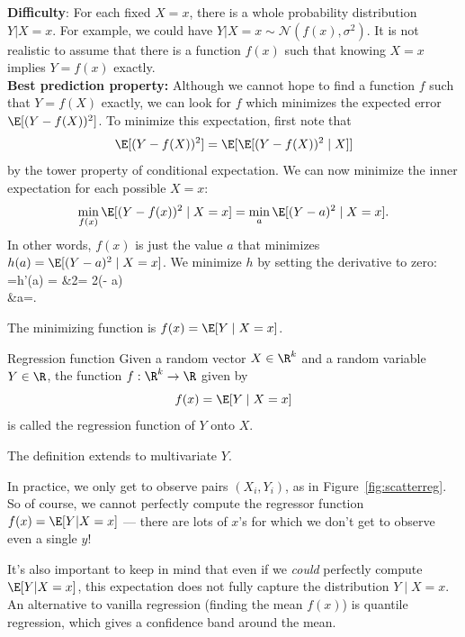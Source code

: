 \documentclass[11pt]{article}
\begin{document}
\noindent\textbf{Difficulty}: For each fixed $X=x$, there is a whole probability distribution $Y|X=x$. For example, we could have $Y|X=x\sim\mathcal N(f(x),\sigma^2)$. It is not realistic to assume that there is a function $f(x)$ such that knowing $X=x$ implies $Y=f(x)$ exactly. \\

\noindent\textbf{Best prediction property:} Although we cannot hope to find a function $f$ such that $Y=f(X)$ exactly, we can look for $f$ which minimizes the expected error $\E[(Y-f(X))^2]$. To minimize this expectation, first note that
$$\E[(Y-f(X))^2] = \E[\E[(Y-f(X))^2\mid X]]$$ by the tower property of conditional expectation. We can now minimize the inner expectation for each possible $X=x$: %
$$\min_{f(x)}\E[(Y-f(x))^2\mid X=x] = \min_{a}\E[(Y-a)^2\mid X=x].$$ In other words, $f(x)$ is just the value $a$ that minimizes $h(a)=\E[(Y-a)^2\mid X=x]$. We minimize $h$ by setting the derivative to zero:
=h'(a) = &2\E[Y-a\mid X=x] = 2(\E[Y\mid X=x] - a)\\
&\Rightarrow a=\E[Y\mid X=x].
\eeqsn

The minimizing function is $f(x)=\E[Y\mid X=x]$.
\begin{defn}{Regression function}{}
Given a random vector $X\in\R^k$ and a random variable $Y\in\R$, the function $f:\R^k\to\R$ given by
$$f(x)=\E[Y\mid X=x]$$ is called the regression function of $Y$ onto $X$.
\end{defn}
\begin{remark}
The definition extends to multivariate $Y$. %
\end{remark}

In practice, we only get to observe pairs $(X_i, Y_i)$, as in Figure~\ref{fig:scatterreg}. So of course, we cannot perfectly compute the regressor function $f(x)=\E[Y|X=x]$ --- there are lots of $x$'s for which we don't get to observe even a single $y$! 

It's also important to keep in mind that even if we \emph{could} perfectly compute $\E[Y|X=x]$, this expectation does not fully capture the distribution $Y\mid X=x$. An alternative to vanilla regression (finding the mean $f(x)$) is quantile regression, which gives a confidence band around the mean. 

\end{document}
